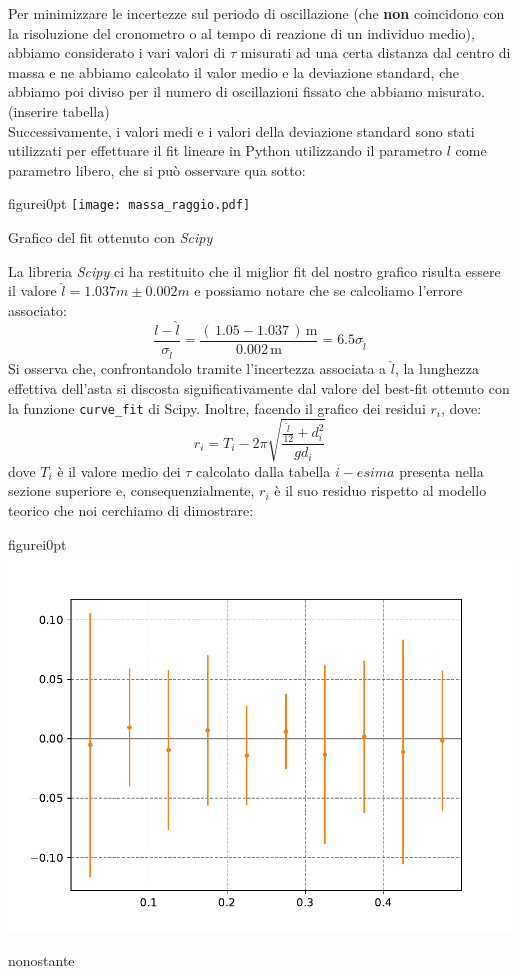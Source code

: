 \documentclass{article}
\begin{document}
Per minimizzare le incertezze sul periodo di oscillazione (che \textbf{non} coincidono con la risoluzione del cronometro o al tempo di reazione di un individuo medio), abbiamo considerato i vari valori di $\tau$ misurati ad una certa distanza dal centro di massa e ne abbiamo calcolato il valor medio e la deviazione standard, che abbiamo poi diviso per il numero di oscillazioni fissato che abbiamo misurato. (inserire tabella) \\ 
Successivamente, i valori medi e i valori della deviazione standard sono stati utilizzati per effettuare il fit lineare in Python utilizzando il parametro $l$ come parametro libero, che si può osservare qua sotto:
\\
\begin{wrapfloat}{figure}{i}{0pt}
	\texttt{[image: massa\_raggio.pdf]}
	\caption{Grafico del fit ottenuto con \textit{Scipy}}
\end{wrapfloat}
La libreria \textit{Scipy} ci ha restituito che il miglior fit del nostro grafico risulta essere il valore $\hat{l} = 1.037 m \pm 0.002 m$ e possiamo notare che se calcoliamo l'errore associato:
$$
	\frac{l - \hat{l}}{\sigma_{\hat{l}}} = \frac{(\, 1.05 - 1.037 \, ) \, \text{m}}{0.002 \, \text{m}} = 6.5 \sigma_{\hat{l}}
$$
Si osserva che, confrontandolo tramite l'incertezza associata a $\hat{l}$, la lunghezza effettiva dell'asta si discosta significativamente dal valore del best-fit ottenuto con la funzione \texttt{curve\_fit} di Scipy. Inoltre, facendo il grafico dei residui $r_i$, dove:
\begin{equation}
	r_i = T_i - 2\pi\sqrt{\frac{\frac{\hat{l}}{12} + d_i^2}{gd_i}}
\end{equation}
dove $T_i$ è il valore medio dei $\tau$ calcolato dalla tabella $i-esima$ presenta nella sezione superiore e, consequenzialmente, $r_i$ è il suo residuo rispetto al modello teorico che noi cerchiamo di dimostrare: \\
\begin{wrapfloat}{figure}{i}{0pt}
	\includegraphics[scale=0.30]{grafico_residui.pdf}
\end{wrapfloat} 
nonostante 
\end{document}
